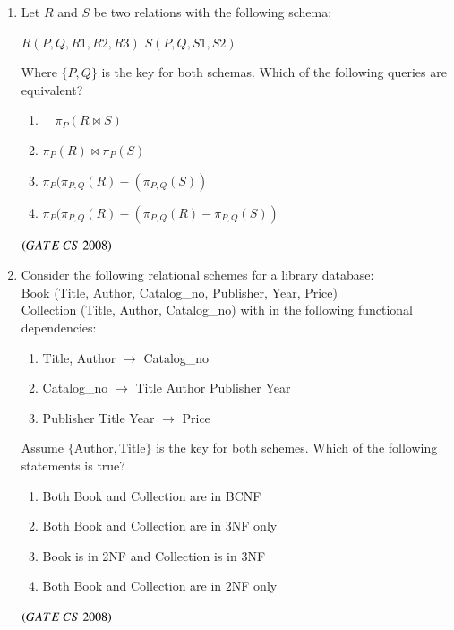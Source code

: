 \documentclass[journal]{IEEEtran}
\numberwithin{equation}{enumi}
\numberwithin{figure}{enumi}
\begin{document}
\begin{enumerate}
\item  Let $R$ and $S$ be two relations with the following schema:

$
R(P, Q, R1, R2, R3)
$
$
S(P, Q, S1, S2)
$

Where $\{P, Q\}$ is the key for both schemas. Which of the following queries are equivalent?

\begin{enumerate}  
   \item $\quad \pi_{P}(R \Join S)$
   \item $\pi_{P}(R) \Join \pi_{P}(S)$
   \item $\pi_{P}(\pi_{P,Q}(R) - (\pi_{P,Q}(S))$
   \item $\pi_{P}(\pi_{P,Q}(R)-(\pi_{P,Q}(R) - \pi_{P,Q}(S))$
\end{enumerate}
\begin{enumerate}
\end{enumerate}
\hfill $\left(GATE\ CS\  2008\right)$

\item Consider the following relational schemes for a library database: \\
{Book (Title, Author, Catalog\_no, Publisher, Year, Price)}\\
{Collection (Title, Author, Catalog\_no)}
with in the following functional dependencies:  
\begin{enumerate}  
   \item Title, Author $\rightarrow$ Catalog\_no  
   \item Catalog\_no $\rightarrow$ Title Author Publisher Year  
   \item Publisher Title Year $\rightarrow$ Price  
\end{enumerate}

Assume $\{\text{Author}, \text{Title}\}$ is the key for both schemes. Which of the following statements is true?  

\begin{enumerate}
   \item Both Book and Collection are in BCNF  
   \item Both Book and Collection are in $3$NF only  
   \item Book is in 2NF and Collection is in $3$NF  
   \item Both Book and Collection are in $2$NF only  
\end{enumerate}
\hfill $\left(GATE\ CS\  2008\right)$
 


\end{enumerate}
\end{document}
